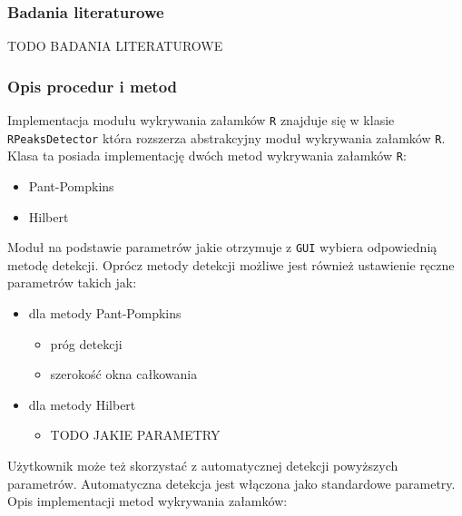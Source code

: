 \documentclass[a4paper, 11pt]{article}
\begin{document}
\subsubsection{Badania literaturowe}
\label{sec:rs:papers}

TODO BADANIA LITERATUROWE

\subsubsection{Opis procedur i metod}
\label{sec:rs:procs}

Implementacja modułu wykrywania załamków \verb|R| znajduje się w klasie \verb|RPeaksDetector| która rozszerza abstrakcyjny moduł wykrywania załamków \verb|R|. Klasa ta posiada implementację dwóch metod wykrywania załamków \verb|R|:
\begin{itemize}
	\item Pant-Pompkins
	\item Hilbert
\end{itemize}
Moduł na podstawie parametrów jakie otrzymuje z \verb|GUI| wybiera odpowiednią metodę detekcji. Oprócz metody detekcji możliwe jest również ustawienie ręczne parametrów takich jak:
\begin{itemize}
	\item dla metody Pant-Pompkins
	\begin{itemize}
		\item próg detekcji
		\item szerokość okna całkowania
	\end{itemize}
	\item dla metody Hilbert
	\begin{itemize}
		\item TODO JAKIE PARAMETRY
	\end{itemize}
\end{itemize}
Użytkownik może też skorzystać z automatycznej detekcji powyższych parametrów. Automatyczna detekcja jest włączona jako standardowe parametry.
Opis implementacji metod wykrywania załamków:
\end{document}
